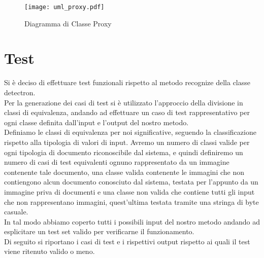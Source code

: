 \documentclass[12pt,a4paper]{article}
\begin{document}
\begin{figure}[H]
    \caption{Diagramma di Classe Proxy}
    \centering
    \texttt{[image: uml\_proxy.pdf]}
\end{figure}

\section{Test}

Si è deciso di effettuare test funzionali rispetto al metodo recognize
della classe detectron.\\
Per la generazione dei casi di test si è utilizzato l'approccio della
divisione in classi di equivalenza, andando ad effettuare un caso di
test rappresentativo per ogni classe definita dall'input e l'output del nostro
metodo.\\
Definiamo le classi di equivalenza per noi significative, seguendo la classificazione rispetto
alla tipologia di valori di input.
Avremo un numero di classi valide per ogni tipologia di documento
riconoscibile dal sistema, e quindi definiremo un numero di casi di
test equivalenti ognuno rappresentato da un immagine contenente tale
documento, una classe valida contenente le immagini che non contiengono alcun documento conosciuto dal sistema,
testata per l'appunto da un immagine priva di documenti
e una classe non valida che contiene tutti gli input che non rappresentano
immagini, quest'ultima testata tramite una stringa di byte casuale.\\
In tal modo abbiamo coperto tutti i possibili input del nostro metodo
andando ad esplicitare un test set valido per verificarne il
funzionamento.\\

Di seguito si riportano i casi di test e i rispettivi output rispetto ai
quali il test viene ritenuto valido o meno.
\end{document}
